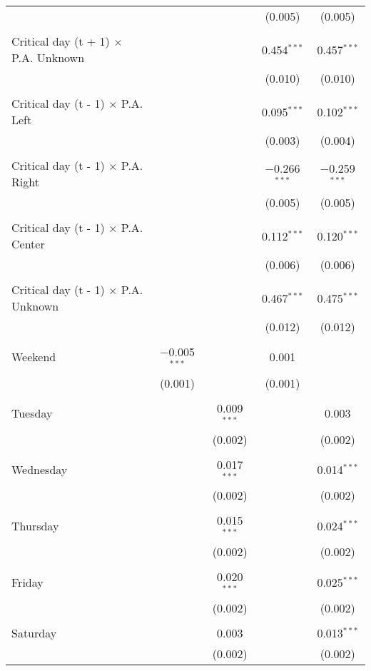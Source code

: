\documentclass[
]{article}
\begin{document}
\begin{table}[!htbp]
{\begin{tabular}{@{\extracolsep{5pt}}lcccc}
  &  &  & (0.005) & (0.005) \\ 
  & & & & \\ 
 Critical day (t + 1) $\times$ P.A. Unknown &  &  & 0.454$^{***}$ & 0.457$^{***}$ \\ 
  &  &  & (0.010) & (0.010) \\ 
  & & & & \\ 
 Critical day (t - 1) $\times$ P.A. Left &  &  & 0.095$^{***}$ & 0.102$^{***}$ \\ 
  &  &  & (0.003) & (0.004) \\ 
  & & & & \\ 
 Critical day (t - 1) $\times$ P.A. Right &  &  & $-$0.266$^{***}$ & $-$0.259$^{***}$ \\ 
  &  &  & (0.005) & (0.005) \\ 
  & & & & \\ 
 Critical day (t - 1) $\times$ P.A. Center &  &  & 0.112$^{***}$ & 0.120$^{***}$ \\ 
  &  &  & (0.006) & (0.006) \\ 
  & & & & \\ 
 Critical day (t - 1) $\times$ P.A. Unknown &  &  & 0.467$^{***}$ & 0.475$^{***}$ \\ 
  &  &  & (0.012) & (0.012) \\ 
  & & & & \\ 
 Weekend & $-$0.005$^{***}$ &  & 0.001 &  \\ 
  & (0.001) &  & (0.001) &  \\ 
  & & & & \\ 
 Tuesday &  & 0.009$^{***}$ &  & 0.003 \\ 
  &  & (0.002) &  & (0.002) \\ 
  & & & & \\ 
 Wednesday &  & 0.017$^{***}$ &  & 0.014$^{***}$ \\ 
  &  & (0.002) &  & (0.002) \\ 
  & & & & \\ 
 Thursday &  & 0.015$^{***}$ &  & 0.024$^{***}$ \\ 
  &  & (0.002) &  & (0.002) \\ 
  & & & & \\ 
 Friday &  & 0.020$^{***}$ &  & 0.025$^{***}$ \\ 
  &  & (0.002) &  & (0.002) \\ 
  & & & & \\ 
 Saturday &  & 0.003 &  & 0.013$^{***}$ \\ 
  &  & (0.002) &  & (0.002) \\ 

\end{tabular}}
\end{table}
\end{document}
